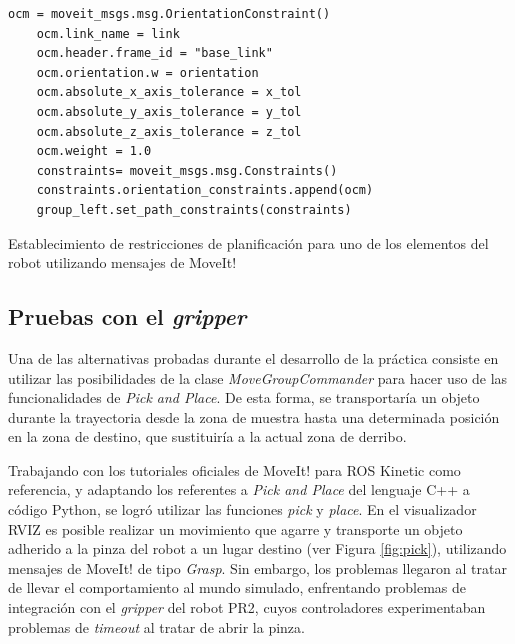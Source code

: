 \documentclass[12pt,spanish,chapterprefix, numbers=noenddot]{book}
\numberwithin{equation}{section}
\numberwithin{figure}{section}
\begin{document}
\begin{algorithm}[htb!]
	\begin{lstlisting}[breaklines=true] 
    ocm = moveit_msgs.msg.OrientationConstraint()
    ocm.link_name = link
    ocm.header.frame_id = "base_link"
    ocm.orientation.w = orientation
    ocm.absolute_x_axis_tolerance = x_tol
    ocm.absolute_y_axis_tolerance = y_tol
    ocm.absolute_z_axis_tolerance = z_tol
    ocm.weight = 1.0
    constraints= moveit_msgs.msg.Constraints()
    constraints.orientation_constraints.append(ocm)
    group_left.set_path_constraints(constraints)
	\end{lstlisting}
\caption{\label{alg:constraints} Establecimiento de restricciones de planificación para uno de los elementos del robot utilizando mensajes de MoveIt!}
\end{algorithm}

\subsection{Pruebas con el \textit{gripper}}

Una de las alternativas probadas durante el desarrollo de la práctica consiste en utilizar las posibilidades de la clase \textit{MoveGroupCommander} para hacer uso de las funcionalidades de \textit{Pick and Place}. De esta forma, se transportaría un objeto durante la trayectoria desde la zona de muestra hasta una determinada posición en la zona de destino, que sustituiría a la actual zona de derribo.  

Trabajando con los tutoriales oficiales de MoveIt! para ROS Kinetic como referencia, y adaptando los referentes a \textit{Pick and Place} del lenguaje C++ a código Python, se logró utilizar las funciones \textit{pick} y \textit{place}. En el visualizador RVIZ es posible realizar un movimiento que agarre y transporte un objeto adherido a la pinza del robot a un lugar destino (ver Figura \ref{fig:pick}), utilizando mensajes de MoveIt! de tipo \textit{Grasp}. Sin embargo, los problemas llegaron al tratar de llevar el comportamiento al mundo simulado, enfrentando problemas de integración con el \textit{gripper} del robot PR2, cuyos controladores experimentaban problemas de \textit{timeout} al tratar de abrir la pinza. 
\end{document}
